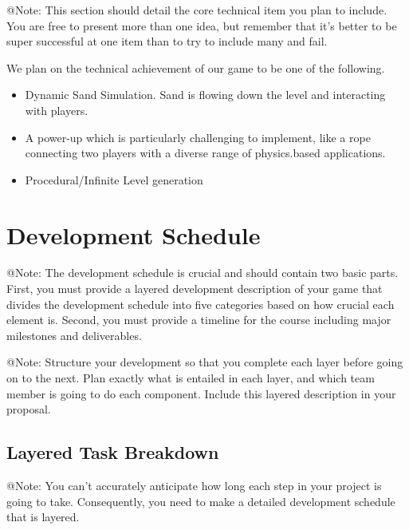 \begin{TempText}
	@Note: This section should detail the core technical item you plan to include. You are free to present more than one idea, but remember that it's better to be super successful at one item than to try to include many and fail.
\end{TempText}

We plan on the technical achievement of our game to be one of the following.

\begin{itemize}
    \item Dynamic Sand Simulation. Sand is flowing down the level and interacting with players.
    \item A power-up which is particularly challenging to implement, like a rope connecting two players with a diverse range of physics.based applications.
    \item Procedural/Infinite Level generation
\end{itemize}


\section{Development Schedule}

\begin{TempText}
	@Note: The development schedule is crucial and should contain two basic parts. First, you must provide a layered development description of your game that divides the development schedule into five categories based on how crucial each element is. Second, you must provide a timeline for the course including major milestones and deliverables.
\end{TempText}

\begin{TempText}
	@Note: Structure your development so that you complete each layer before going on to the next. Plan exactly what is entailed in each layer, and which team member is going to do each component. Include this layered description in your proposal.
\end{TempText}

\subsection{Layered Task Breakdown}

\begin{TempText}
	@Note: You can't accurately anticipate how long each step in your project is going to take. Consequently, you need to make a detailed development schedule that is layered.
\end{TempText}

